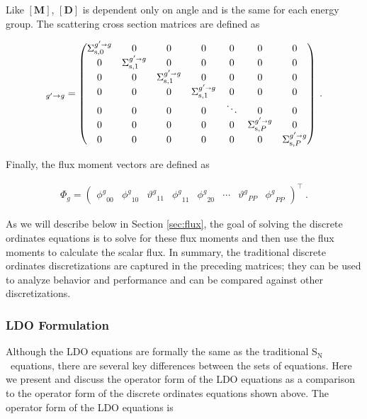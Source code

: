 \documentclass{article} %
\newcommand{\sa}{\shortrightarrow}
\newcommand{\sn}{S$_\mathrm{N}$}
\newcommand{\ve}[1]{\ensuremath{\mathbf{#1}}}
\newcommand{\Sigg}[1]{\ensuremath{\Sigma^{g'\sa g}_{\text{s},#1}}}
\newcommand{\even}{\ensuremath{\phi^g}}
\newcommand{\odd}{\ensuremath{\vartheta^g}}
\begin{document}
\noindent Like $[\ve{M}]$, $[\ve{D}]$ is dependent only on angle and is the
same for each energy group. The scattering cross section matrices are defined
as

\begin{equation}
  [\ve{S}]_{g'\rightarrow g} = \begin{pmatrix}
    \Sigg{0} & 0 & 0 & 0 & 0 & 0 & 0 \\
    0 & \Sigg{1} & 0 & 0 & 0 & 0 & 0 \\
    0 & 0 & \Sigg{1} & 0 & 0 & 0 & 0 \\
    0 & 0 & 0 & \Sigg{1} & 0 & 0 & 0 \\
    0 & 0 & 0 & 0 & \ddots   & 0 & 0 \\
    0 & 0 & 0 & 0 & 0 & \Sigg{P} & 0 \\
    0 & 0 & 0 & 0 & 0 & 0 & \Sigg{P}
  \end{pmatrix}\:.
\label{denovo_scatter}
\end{equation}

\noindent Finally, the flux moment vectors are defined as

\begin{align}
  \Phi_g = \begin{pmatrix}
    \even_{00} & \even_{10} & \odd_{11} & \even_{11} & \even_{20}
    & \cdots & \odd_{PP} & \even_{PP}
  \end{pmatrix}^\top\:.
\end{align}

\noindent As we will describe below in Section \ref{sec:flux}, the 
goal of solving the discrete ordinates equations is to solve for these flux
moments and then use the flux moments to calculate the scalar flux. In summary,
the traditional discrete ordinates discretizations are captured in the
preceding matrices; they can be used to analyze behavior and performance and
can be compared against other discretizations.

\subsubsection{LDO Formulation}

Although the LDO equations are formally the same as the traditional \sn\
equations, there are several key differences between the sets of equations.
Here we present and discuss the operator form of the LDO equations as a
comparison to the operator form of the discrete ordinates
equations shown above. The operator form of the LDO equations is
\end{document}

